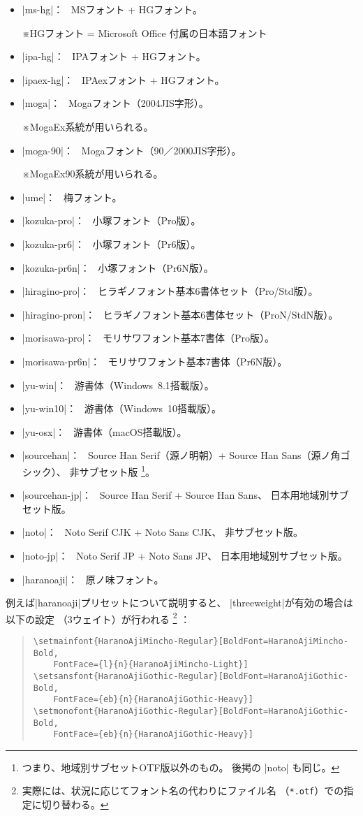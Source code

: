 \documentclass[xelatex,ja=standard,jafont=ipaex,
  a4paper]{bxjsarticle}
\newcommand{\Note}{\par\noindent ※}
\newcommand{\Means}{：\ }
\newcommand{\JSl}{\mbox{／}\linebreak[0]}
\begin{document}
\begin{itemize}
\item |ms-hg|\Means
  MSフォント + HGフォント。
  \Note HGフォント = Microsoft Office 付属の日本語フォント
\item |ipa-hg|\Means
  IPAフォント + HGフォント。
\item |ipaex-hg|\Means
  IPAexフォント + HGフォント。
\item |moga|\Means
  Mogaフォント（2004JIS字形）。
  \Note MogaEx系統が用いられる。
\item |moga-90|\Means
  Mogaフォント（90\JSl 2000JIS字形）。
  \Note MogaEx90系統が用いられる。
\item |ume|\Means
  梅フォント。
\item |kozuka-pro|\Means
  小塚フォント（Pro版）。
\item |kozuka-pr6|\Means
  小塚フォント（Pr6版）。
\item |kozuka-pr6n|\Means
  小塚フォント（Pr6N版）。
\item |hiragino-pro|\Means
  ヒラギノフォント基本6書体セット（Pro/Std版）。
\item |hiragino-pron|\Means
  ヒラギノフォント基本6書体セット（ProN/StdN版）。
\item |morisawa-pro|\Means
  モリサワフォント基本7書体（Pro版）。
\item |morisawa-pr6n|\Means
  モリサワフォント基本7書体（Pr6N版）。
\item |yu-win|\Means
  游書体（Windows~8.1搭載版）。
\item |yu-win10|\Means
  游書体（Windows~10搭載版）。%
\item |yu-osx|\Means
  游書体（macOS搭載版）。
\item |sourcehan|\Means
  Source Han Serif（源ノ明朝）+ Source Han Sans（源ノ角ゴシック）、
  非サブセット版%
  \footnote{つまり、地域別サブセットOTF版以外のもの。
    後掲の |noto| も同じ。}。
\item |sourcehan-jp|\Means
  Source Han Serif + Source Han Sans、
  日本用地域別サブセット版。
\item |noto|\Means
  Noto Serif CJK + Noto Sans CJK、
  非サブセット版。
\item |noto-jp|\Means
  Noto Serif JP + Noto Sans JP、
  日本用地域別サブセット版。
\item |haranoaji|\Means
  原ノ味フォント。
\end{itemize}

例えば\>|haranoaji|\>プリセットについて説明すると、%
|threeweight|\>が有効の場合は以下の設定
（3ウェイト）が行われる%
\footnote{実際には、状況に応じてフォント名の代わりにファイル名
（\texttt{*.otf}）での指定に切り替わる。}
：
\begin{quote}\small\begin{verbatim}
\setmainfont{HaranoAjiMincho-Regular}[BoldFont=HaranoAjiMincho-Bold,
    FontFace={l}{n}{HaranoAjiMincho-Light}]
\setsansfont{HaranoAjiGothic-Regular}[BoldFont=HaranoAjiGothic-Bold,
    FontFace={eb}{n}{HaranoAjiGothic-Heavy}]
\setmonofont{HaranoAjiGothic-Regular}[BoldFont=HaranoAjiGothic-Bold,
    FontFace={eb}{n}{HaranoAjiGothic-Heavy}]
\end{verbatim}\end{quote}
\end{document}
